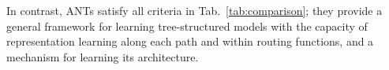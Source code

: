 

In contrast, ANTs satisfy all criteria in Tab.~\ref{tab:comparison}; they provide a general framework for learning tree-structured models with the capacity of representation learning along each path and within routing functions, and a mechanism for learning its architecture.

